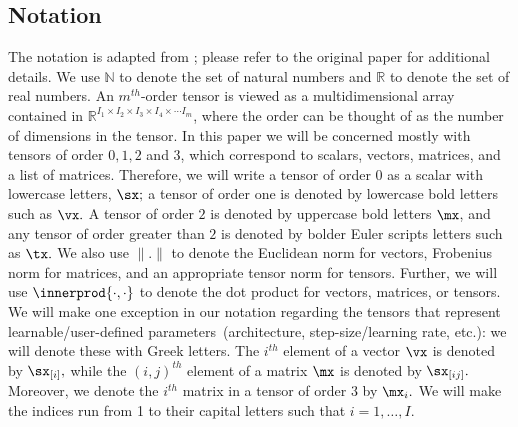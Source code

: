 \subsection{Notation}
The notation is adapted from \cite{kolda2009tensor}; please refer to the original paper for additional details. We use $\mathbb{N}$ to denote the set of natural numbers and $\mathbb{R}$ to denote the set of real numbers.  An $m^{th}$-order tensor is viewed as a multidimensional array contained in $\mathbb{R}^{I_1 \times I_2 \times I_3 \times I_4 \times \cdots I_{m}}$,  where the order can be thought of as the number of dimensions in the tensor. In this paper we will  be concerned mostly with tensors of order $0, 1, 2$ and $3$, which correspond to scalars, vectors, matrices, and a list of matrices. Therefore, we will write a tensor of order $0$ as a scalar with lowercase letters,  $\sx;$  a tensor of order one is denoted by lowercase bold letters such as $\vx.$ A tensor of order $2$ is 
denoted by uppercase bold letters $\mx$, and any tensor of order greater than $2$ is denoted by bolder Euler scripts letters such as $\tx.$  We also use $\|.\|$ to denote the Euclidean norm for vectors, Frobenius norm for matrices, and an appropriate tensor norm for tensors. Further, we will use $\innerprod{\cdot,\cdot}$ to denote the dot product for vectors, matrices, or tensors. We will make one exception in our notation regarding the tensors that represent learnable/user-defined parameters~(architecture, step-size/learning rate, etc.): we will denote these with Greek letters. The $i^{th}$ element of a vector $\vx$ is denoted by $\sx_{[i]},$ while the $(i,j)^{th}$ element of a matrix $\mx$ is denoted by $\sx_{[ij]}.$ Moreover, we denote the $i^{th}$ matrix in a tensor of order $3$ by $\mx_i.$  We will make the indices run from 1 to their capital letters such that $i = 1, \ldots, I.$ 


